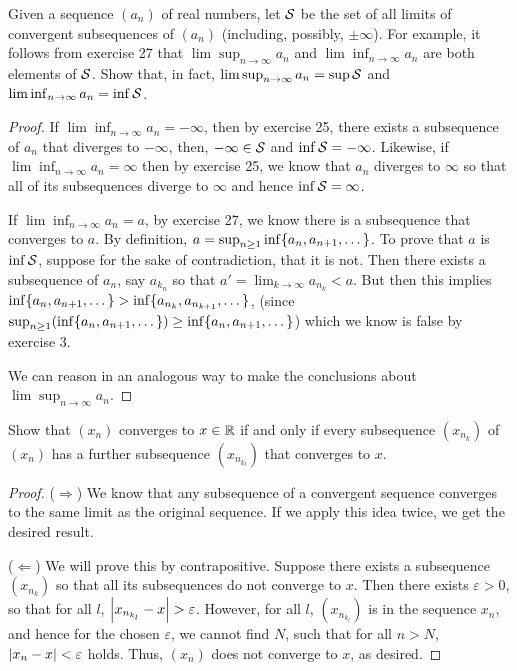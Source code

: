 \begin{exercise}{32}
Given a sequence $(a_n)$ of real numbers, let $\mathcal{S}$ be the set of all limits of convergent subsequences of $(a_n)$ (including, possibly, $\pm\infty$). For example, it follows from exercise 27 that $\lim\sup_{n\to\infty}a_n$ and $\lim\inf_{n\to\infty}a_n$ are both elements of $\mathcal{S}$. Show that, in fact, $\lim\sup_{n\to\infty}a_n= \sup\mathcal{S}$ and $\lim\inf_{n\to\infty}a_n= \inf\mathcal{S}$.
\end{exercise}
\begin{proof}
If $\lim\inf_{n\to\infty}a_n=-\infty$, then by exercise 25, there exists a subsequence of $a_n$ that diverges to $-\infty$, then, $-\infty\in\mathcal{S}$ and $\inf\mathcal{S} =-\infty$. Likewise, if $\lim\inf_{n\to\infty}a_n=\infty$ then by exercise 25, we know that $a_n$ diverges to $\infty$ so that all of its subsequences diverge to $\infty$ and hence $\inf\mathcal{S} =\infty$.

If $\lim\inf_{n\to\infty}a_n=a$, by exercise 27, we know there is a subsequence that converges to $a$. By definition, $a =\sup_{n\geq 1}\inf\{a_n,a_{n+1},\dots\}$. To prove that $a$ is $\inf\mathcal{S}$, suppose for the sake of contradiction, that it is not. Then there exists a subsequence of $a_n$, say $a_{k_n}$ so that $a'=\lim_{k\to\infty}a_{n_k}<a$. But then this implies $\inf\{a_n,a_{n+1},\dots\}>\inf\{a_{n_k},a_{n_{k+1}},\dots\}$, (since $\sup_{n\geq 1}(\inf\{a_n,a_{n+1},\dots\})\geq\inf\{a_n,a_{n+1},\dots\}$) which we know is false by exercise 3. 

We can reason in an analogous way to make the conclusions about $\lim\sup_{n\to\infty}a_n$. 
\end{proof}

\begin{exercise}{33}
Show that $(x_n)$ converges to $x\in\mathbb{R}$ if and only if every subsequence $(x_{n_k})$ of $(x_n)$ has a further subsequence $(x_{n_{k_l}})$ that converges to $x$.
\end{exercise}
\begin{proof}
($\Rightarrow$) We know that any subsequence of a convergent sequence converges to the same limit as the original sequence. If we apply this idea twice, we get the desired result.

($\Leftarrow$) We will prove this by contrapositive. Suppose there exists a subsequence $(x_{n_k})$ so that all its subsequences do not converge to $x$. Then there exists $\varepsilon>0$, so that for all $l$, $\left\lvert x_{n_{k_l}}-x\right\rvert>\varepsilon$. However, for all $l$, $(x_{n_{k_l}})$ is in the sequence $x_n$, and hence for the chosen $\varepsilon$, we cannot find $N$, such that for all $n>N$, $\left\lvert x_n-x\right\rvert<\varepsilon$ holds. Thus, $(x_n)$ does not converge to $x$, as desired.
\end{proof}

